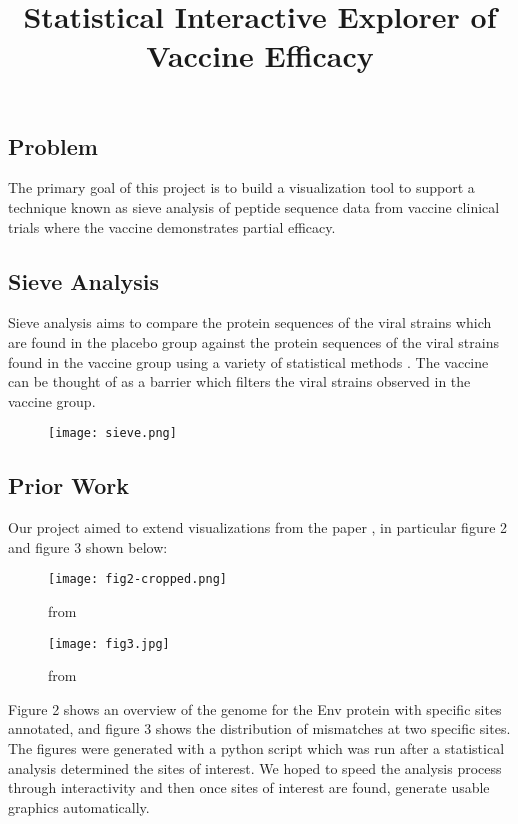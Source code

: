 \documentclass[5pt,clinic]{hmcposter}
\title{Statistical Interactive Explorer of Vaccine Efficacy}
\begin{document}
\begin{poster}

\section{Problem}
The primary goal of this project is to build a visualization tool to support a technique known as sieve analysis of peptide sequence data from vaccine clinical trials where the vaccine demonstrates partial efficacy.  

\subsection{Sieve Analysis}
Sieve analysis aims to compare the protein sequences of the viral strains which are found in the placebo group against the protein sequences of the viral strains found in the vaccine group using a variety of statistical methods \cite{edlefsen2014comprehensive}.  The vaccine can be thought of as a barrier which filters the viral strains observed in the vaccine group.

\begin{figure}
\texttt{[image: sieve.png]}
\caption{}
\end{figure}

\subsection{Prior Work}
Our project aimed to extend visualizations from the paper \cite{edlefsen2014comprehensive}, in particular figure 2 and figure 3 shown below:

\begin{figure}
\texttt{[image: fig2-cropped.png]}
\caption{from \cite{edlefsen2014comprehensive}}
\end{figure}
\begin{figure}
\texttt{[image: fig3.jpg]}
\caption{from \cite{edlefsen2014comprehensive}}
\end{figure}

Figure 2 shows an overview of the genome for the Env protein with specific sites annotated, and figure 3 shows the distribution of mismatches at two specific sites. The figures were generated with a python script which was run after a statistical analysis determined the sites of interest. We hoped to speed the analysis process through interactivity and then once sites of interest are found, generate usable graphics automatically.


\end{poster}
\end{document}
